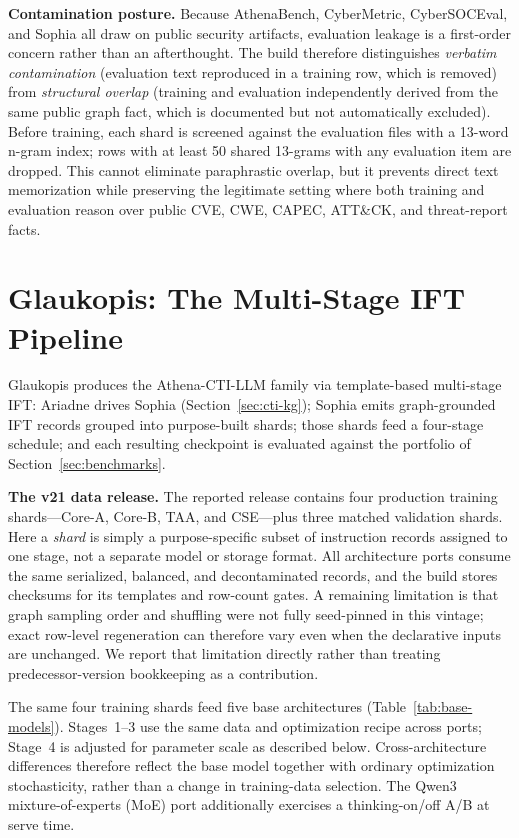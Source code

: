\documentclass[conference]{IEEEtran}
\begin{document}
\textbf{Contamination posture.} Because AthenaBench, CyberMetric, CyberSOCEval, and Sophia all draw on public security artifacts, evaluation leakage is a first-order concern rather than an afterthought. The build therefore distinguishes \emph{verbatim contamination} (evaluation text reproduced in a training row, which is removed) from \emph{structural overlap} (training and evaluation independently derived from the same public graph fact, which is documented but not automatically excluded). Before training, each shard is screened against the evaluation files with a 13-word n-gram index; rows with at least 50 shared 13-grams with any evaluation item are dropped. This cannot eliminate paraphrastic overlap, but it prevents direct text memorization while preserving the legitimate setting where both training and evaluation reason over public CVE, CWE, CAPEC, ATT\&CK, and threat-report facts.

\section{Glaukopis: The Multi-Stage IFT Pipeline}
\label{sec:glaukopis}

Glaukopis produces the Athena-CTI-LLM family via template-based multi-stage IFT: Ariadne drives Sophia (Section~\ref{sec:cti-kg}); Sophia emits graph-grounded IFT records grouped into purpose-built shards; those shards feed a four-stage schedule; and each resulting checkpoint is evaluated against the portfolio of Section~\ref{sec:benchmarks}.

\textbf{The v21 data release.} The reported release contains four production training shards---Core-A, Core-B, TAA, and CSE---plus three matched validation shards. Here a \emph{shard} is simply a purpose-specific subset of instruction records assigned to one stage, not a separate model or storage format. All architecture ports consume the same serialized, balanced, and decontaminated records, and the build stores checksums for its templates and row-count gates. A remaining limitation is that graph sampling order and shuffling were not fully seed-pinned in this vintage; exact row-level regeneration can therefore vary even when the declarative inputs are unchanged. We report that limitation directly rather than treating predecessor-version bookkeeping as a contribution.

The same four training shards feed five base architectures (Table~\ref{tab:base-models}). Stages~1--3 use the same data and optimization recipe across ports; Stage~4 is adjusted for parameter scale as described below. Cross-architecture differences therefore reflect the base model together with ordinary optimization stochasticity, rather than a change in training-data selection. The Qwen3 mixture-of-experts (MoE) port additionally exercises a thinking-on/off A/B at serve time.
\end{document}
